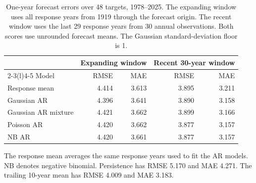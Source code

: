 \begin{table}[htbp]
\centering\small
\caption{One-year forecast errors over 48 targets, 1978--2025. The expanding window uses all response years from 1919 through the forecast origin. The recent window uses the last 29 response years from 30 annual observations. Both scores use unrounded forecast means. The Gaussian standard-deviation floor is 1.}
\label{tab:ar-reassessment}
\begin{tabular}{@{}lrrrr@{}}
\toprule
& \multicolumn{2}{c}{Expanding window} & \multicolumn{2}{c}{Recent 30-year window} \\
\cmidrule(lr){2-3}\cmidrule(l){4-5}
Model & RMSE & MAE & RMSE & MAE \\
\midrule
Response mean & 4.414 & 3.613 & 3.895 & 3.211 \\
Gaussian AR & 4.396 & 3.641 & 3.890 & 3.158 \\
Gaussian AR mixture & 4.421 & 3.662 & 3.899 & 3.166 \\
Poisson AR & 4.420 & 3.662 & 3.877 & 3.157 \\
NB AR & 4.420 & 3.661 & 3.877 & 3.157 \\
\bottomrule
\end{tabular}
\par\smallskip
\begin{minipage}{0.92\linewidth}\footnotesize
The response mean averages the same response years used to fit the AR models. NB denotes negative binomial.
Persistence has RMSE 5.170 and MAE 4.271. The trailing 10-year mean has RMSE 4.009 and MAE 3.183.
\end{minipage}
\end{table}
